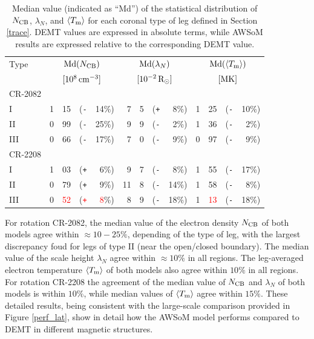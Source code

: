 \documentclass[namedreferences]{solarphysics}
\def\edit#1{\textcolor{Red}{#1}}
\newcommand{\mrsun}{{\rm R_\odot}}
\newcommand{\med}{{\rm Md}}
\newcommand{\avgTe}{\left<\Tm\right>}
\newcommand{\MK}{{\rm MK}}
\newcommand{\lN}{\lambda_N}
\newcommand{\NCB}{N_{\rm CB}}
\newcommand{\Tm}{T_{\rm m}}
\newcommand{\aTm}{\left<\Tm\right>}
\newcommand{\Pl}{\texttt{+}}
\newcommand{\Mi}{\texttt{-}}
\begin{document}
\begin{article}
\begin{table}
\begin{tabular}{l r@{.}l@{\hskip 0.05in} r@{\hskip 0.01in} r  r@{.}l@{\hskip 0.05in} r@{\hskip 0.01in} r r@{.}l@{\hskip 0.05in} r@{\hskip 0.01in} r }
\hline
Type    & \multicolumn{4}{c}{$\med(\NCB)$}             & \multicolumn{4}{c}{$\med(\lN)$} & \multicolumn{4}{c}{$\med(\avgTe)$} \\
        & \multicolumn{4}{c}{$[10^8\,{\rm cm}^{-3}]$}  & \multicolumn{4}{c}{$[{\rm 10}^{-2}\,\mrsun]$} & \multicolumn{4}{c}{$[\MK]$} \\
\hline
CR-2082\\
I    & 1&15 &(\Mi&14\%)  &   7&5 &(\Pl&~8\%) &   1&25 &(\Mi&10\%) \\
II   & 0&99 &(\Mi&25\%)  &   9&9 &(\Mi&~2\%) &   1&36 &(\Mi&~2\%) \\
III  & 0&66 &(\Mi&17\%)  &   7&0 &(\Mi&~9\%) &   0&97 &(\Mi&~9\%) \\
\hline          
CR-2208\\
I    & 1&03 &(\Pl&~6\%)  &   9&7 &(\Mi&~8\%) &   1&55 &(\Mi&17\%) \\
II   & 0&79 &(\Pl&~9\%)  &  11&8 &(\Mi&14\%) &   1&58 &(\Mi&~8\%) \\
III  & 0&\edit{52} &(\edit{\Pl}&~\edit{8}\%)  &   8&9 &(\Mi&18\%) &   1&\edit{13} &(\Mi&18\%) \\
\hline   
\end{tabular}
\caption{Median value (indicated as ``Md'') of the statistical distribution of $\NCB$, $\lN$, and $\aTm$ for each coronal type of leg defined in Section \ref{trace}. DEMT values are expressed in absolute terms, while AWSoM results are expressed relative to the corresponding DEMT value.}
\label{tabla_comp}
\end{table}

{For rotation CR-2082, the median value of the electron density $\NCB$ of both models agree within $\approx 10-25\%$, {depending of the type of leg, with the largest discrepancy foud for legs of type II (near the open/closed boundary). The} median value of the scale height $\lN$ agree {within $\approx 10\%$ in all regions}. The leg-averaged electron temperature $\aTm$ of both models also agree {within $10\%$ in all regions}. For rotation CR-2208 the agreement of the median value of $\NCB$ and $\lN$ of both models {is within $10\%$, while} median values of $\aTm$ agree within $15\%$. {These detailed results, being consistent with the large-scale comparison provided in Figure \ref{perf_lat}, show in detail how the AWSoM model performs compared to DEMT in different magnetic structures.}}


\end{article}
\end{document}
